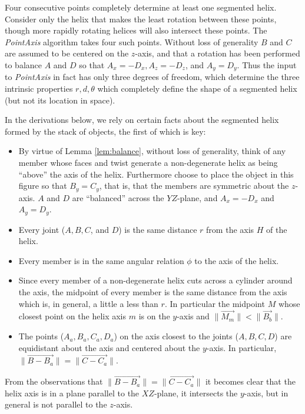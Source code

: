 \documentclass[11pt]{article}
\begin{document}
{Four consecutive points completely determine at least one segmented helix.
Consider
only the helix that makes the least rotation between these points,
though more rapidly rotating helices will also intersect these points.
The {\em PointAxis} algorithm
takes four such points. Without loss of generality $B$ and $C$
are assumed to be centered on the $z$-axis, and that a
rotation has been performed to balance $A$ and $D$ so that $A_x = -D_x, A_z = -D_z$, and $A_y = D_y$. Thus the input to
{\em PointAxis} in fact has only three degrees of freedom, which determine the three intrinsic properties $r,d,\theta$
which completely define the shape of a segmented helix (but not its location in space).


In the derivations below, we rely on certain facts about
the segmented helix formed by the stack of objects, the first
of which is key:
\begin{itemize}
\item By virtue of Lemma \ref{lem:balance}, without loss of generality, think of any member whose faces
  and twist generate a non-degenerate helix as being ``above'' the
  axis of the helix. Furthermore choose to place the object in
  this figure so that $B_y = C_y$, that is, that the members are symmetric
  about the $z$-axis.
  $A$ and $D$ are ``balanced'' across the $YZ$-plane,
  and $A_x = -D_x$ and $A_y = D_y$.
\item Every joint ($A,B,C$, and $D$) is the same distance $r$ from the axis $H$ of the helix.
\item Every member is in the same angular relation $\phi$ to the axis of the helix.
\item Since every member of a non-degenerate helix cuts across a cylinder around the axis,
  the midpoint of every member is the same distance from the axis
  which is, in general, a little a less than $r$. In particular the midpoint $M$
  whose closest point on the helix axis $m$ is on the $y$-axis and
  $\| \overrightarrow{M_m} \| < \| \overrightarrow{B_b} \|$.
\item The points ($A_a,B_a,C_a,D_a$) on the axis closest to the joints ($A,B,C,D$)
  are equidistant about the axis and centered about the $y$-axis. In
  particular, $\| \overrightarrow{B - B_a} \| = \| \overrightarrow{C - C_a} \|$.
\end{itemize}

From the observations that $\| \overrightarrow{B - B_a} \| = \| \overrightarrow{C - C_a} \|$
it becomes clear that the helix axis is in a plane
parallel to the $XZ$-plane, it intersects the $y$-axis, but in general is
not parallel to the $z$-axis.

}
\end{document}

